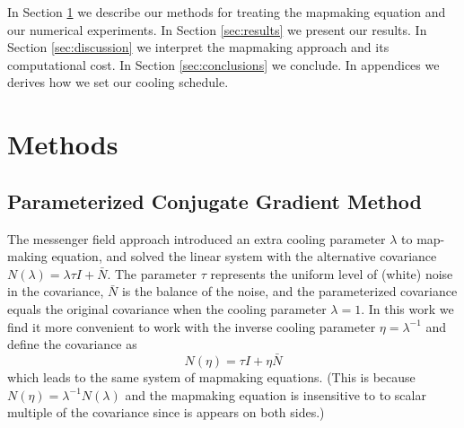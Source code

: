 \documentclass[twocolumn,linenumbers]{aastex631}
\DeclareMathOperator*{\argmin}{arg\,min}
\newcommand{\vbd}{\vb{d}}
\newcommand{\vbm}{\vb{m}}
\newcommand{\vbn}{\vb{n}}
\newcommand{\inv}[1]{#1^{-1}}
\newcommand{\hatm}{\vb{\hat{m}}}
\newcommand{\Pdagger}{P^{\dagger}}
\newcommand{\Nbar}{\bar{N}}
\newcommand{\PPinv}[1]{\inv{\qty(\Pdagger #1 P)}}
\begin{document}




In Section \ref{sec:methods} we describe our methods for treating the mapmaking equation and our numerical experiments.  In Section \ref{sec:results} we present our results. In Section \ref{sec:discussion} we interpret the mapmaking approach and its computational cost.  In Section \ref{sec:conclusions} we conclude.  In appendices we derives how we set our cooling schedule.


\section{Methods}\label{sec:methods}

\subsection{Parameterized Conjugate Gradient Method}
The messenger field approach introduced an extra cooling parameter $\lambda$ to
map-making equation, and solved the linear system with the alternative covariance $N(\lambda) =  \lambda \tau I + \Nbar $.  The parameter $\tau$ represents the uniform level of (white) noise in the covariance, $\Nbar$ is the balance of the noise, and the parameterized covariance equals the original covariance when the cooling parameter $\lambda = 1$.  In this work we find it more convenient to work with the inverse cooling parameter $\eta = \lambda^{-1}$ and define the covariance as
\begin{equation}
  N(\eta) = \tau I +  \eta \Nbar 
\end{equation}
which leads to the same system of mapmaking equations.  (This is because $N(\eta) = \lambda^{-1} N(\lambda)$ and the mapmaking equation is insensitive to to scalar multiple of the covariance since is appears on both sides.)
\end{document}

